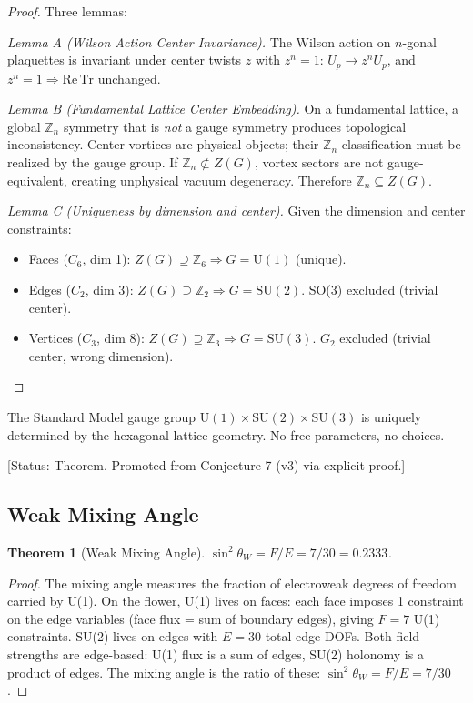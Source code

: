 \documentclass[12pt,a4paper]{article}
\theoremstyle{plain}
\newtheorem{theorem}{Theorem}[section]
\theoremstyle{definition}
\newcommand{\elabel}[1]{\textsf{\small [#1]}}
\begin{document}
\begin{proof}
Three lemmas:

\emph{Lemma A (Wilson Action Center Invariance).} The Wilson action on $n$-gonal plaquettes is invariant under center twists $z$ with $z^n = 1$: $U_p \to z^n U_p$, and $z^n = 1 \Rightarrow \mathrm{Re}\,\mathrm{Tr}$ unchanged.

\emph{Lemma B (Fundamental Lattice Center Embedding).} On a fundamental lattice, a global $\mathbb{Z}_n$ symmetry that is \emph{not} a gauge symmetry produces topological inconsistency. Center vortices are physical objects; their $\mathbb{Z}_n$ classification must be realized by the gauge group. If $\mathbb{Z}_n \not\subset Z(G)$, vortex sectors are not gauge-equivalent, creating unphysical vacuum degeneracy. Therefore $\mathbb{Z}_n \subseteq Z(G)$.

\emph{Lemma C (Uniqueness by dimension and center).} Given the dimension and center constraints:
\begin{itemize}[nosep]
\item Faces ($C_6$, dim 1): $Z(G) \supseteq \mathbb{Z}_6 \Rightarrow G = \mathrm{U}(1)$ (unique).
\item Edges ($C_2$, dim 3): $Z(G) \supseteq \mathbb{Z}_2 \Rightarrow G = \mathrm{SU}(2)$. SO(3) excluded (trivial center).
\item Vertices ($C_3$, dim 8): $Z(G) \supseteq \mathbb{Z}_3 \Rightarrow G = \mathrm{SU}(3)$. $G_2$ excluded (trivial center, wrong dimension). \qedhere
\end{itemize}
\end{proof}

The Standard Model gauge group $\mathrm{U}(1) \times \mathrm{SU}(2) \times \mathrm{SU}(3)$ is uniquely determined by the hexagonal lattice geometry. No free parameters, no choices.

\elabel{Status: Theorem. Promoted from Conjecture 7 (v3) via explicit proof.}

\subsection{Weak Mixing Angle}\label{sec:weinberg}

\begin{theorem}[Weak Mixing Angle]\label{thm:weinberg}
$\sin^2\theta_W = F/E = 7/30 = 0.2333$.
\end{theorem}

\begin{proof}
The mixing angle measures the fraction of electroweak degrees of freedom carried by U(1). On the flower, U(1) lives on faces: each face imposes 1 constraint on the edge variables (face flux = sum of boundary edges), giving $F = 7$ U(1) constraints. SU(2) lives on edges with $E = 30$ total edge DOFs. Both field strengths are edge-based: U(1) flux is a sum of edges, SU(2) holonomy is a product of edges. The mixing angle is the ratio of these: $\sin^2\theta_W = F/E = 7/30$. \qedhere
\end{proof}
\end{document}
